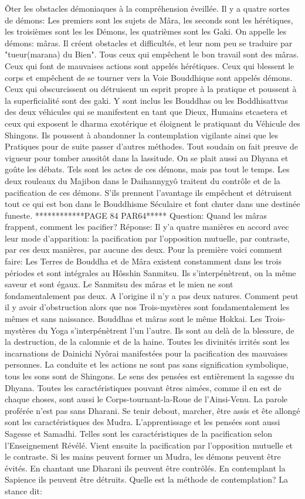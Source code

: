 Ôter les obstacles démoniaques à la compréhension éveillée.
Il y a quatre sortes de démons: Les premiers sont les sujets de Mâra, les seconds sont les hérétiques, les troisièmes sont les les Démons, les quatrièmes sont les Gaki. On appelle les démons: mâras. Il créent obstacles et difficultés, et leur nom peu se traduire par "tueur(marana) du Bien". Tous ceux qui empêchent le bon travail sont des mâras. Ceux qui font de mauvaises actions sont appelés hérétiques. Ceux qui blessent le corps et empêchent de se tourner vers la Voie Bouddhique sont appelés démons. Ceux qui obscurcissent ou détruisent un esprit propre à la pratique et poussent à la superficialité sont des gaki. Y sont inclus les Bouddhas ou les Boddhisattvas des deux véhicules qui se manifestent en tant que Dieux, Humains etcaetera et ceux qui exposent le dharma exotérique et éloignent le pratiquant du Véhicule des Shingons. Ils poussent à abandonner la contemplation vigilante ainsi que les Pratiques pour de suite passer d'autres méthodes. Tout soudain on fait preuve de vigueur pour tomber aussitôt dans la lassitude. On se plait aussi au Dhyana et goûte les débats. Tels sont les actes de ces démons, mais pas tout le temps.
Les deux rouleaux du Majibon dans le Daihannygyô traitent du contrôle et de la pacification de ces démons. S'ils prennent l'avantage ils empêchent et détruisent tout ce qui est bon dans le Bouddhisme Séculaire et font chuter dans une destinée funeste.    ************PAGE 84 PAR64*****
Question: Quand les mâras frappent, comment les pacifier?
Réponse: Il y'a quatre manières en accord avec leur mode d'apparition: la pacification par l'opposition mutuelle, par contraste, par ces deux manières, par aucune des deux. Pour la première voici comment faire: Les Terres de Bouddha et de Mâra existent constamment dans les trois périodes et sont intégrales au Hôsshin Sanmitsu. Ils s'interpénètrent, on la même saveur et sont égaux. Le Sanmitsu des mâras et le mien ne sont fondamentalement pas deux. A l'origine il n'y a pas deux natures. Comment peut il y avoir d'obstruction alors que nos Trois-mystères sont fondamentalement les mêmes et sans naissance. Bouddhas et mâras sont le même Hokkai. Les Trois-mystères du Yoga s'interpénètrent l'un l'autre. Ils sont au delà de la blessure, de la destruction, de la calomnie et de la haine. Toutes les divinités irrités sont les incarnations de Dainichi Nyôrai manifestées pour la pacification des mauvaises personnes. La conduite et les actions ne sont pas sans signification symbolique, tous les sons sont de Shingons. Le sens des pensées est entièrement la sagesse du Dhyana. Toutes les caractéristiques pouvant êtres aimées, comme il en est de chaque choses, sont aussi le Corps-tournant-la-Roue de l'Ainsi-Venu. La parole proférée n'est pas sans Dharani. Se tenir debout, marcher, être assis et ête allongé sont les caractéristiques des Mudra. L'apprentissage et les pensées sont aussi Sagesse et Samadhi. Telles sont les caractéristiques de la pacification selon l'Enseignement Révélé.
Vient ensuite la pacification par l'opposition mutuelle et le contraste. Si les mains peuvent former un Mudra, les démons peuvent être évités. En chantant une Dharani ils peuvent être contrôlés. En contemplant la Sapience ils peuvent être détruits. Quelle est la méthode de contemplation? La stance dit:

